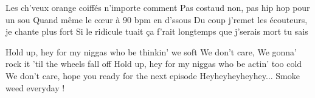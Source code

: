 Les ch'veux orange coiffés n'importe comment
Pas costaud non, pas hip hop pour un sou
Quand même le cœur à 90 bpm en d'ssous
Du coup j'remet les écouteurs, je chante plus fort
Si le ridicule tuait ça f'rait longtemps que j'serais mort tu sais

Hold up, hey for my niggas who be thinkin' we soft
We don't care, We gonna' rock it 'til the wheels fall off
Hold up, hey for my niggas who be actin' too cold
We don't care, hope you ready for the next episode
Heyheyheyheyhey... Smoke weed everyday ! 